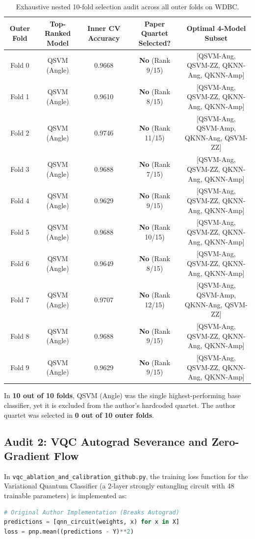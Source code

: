 \begin{table}[H]
\centering
\small
\caption{Exhaustive nested 10-fold selection audit across all outer folds on WDBC.}
\label{tab:nested-audit-table}
\begin{tabularx}{\textwidth}{ccccc}
\toprule
\textbf{Outer Fold} & \textbf{Top-Ranked Model} & \textbf{Inner CV Accuracy} & \textbf{Paper Quartet Selected?} & \textbf{Optimal 4-Model Subset} \\
\midrule
Fold 0 & QSVM (Angle) & 0.9668 & \textbf{No} (Rank 9/15) & [QSVM-Ang, QSVM-ZZ, QKNN-Ang, QKNN-Amp] \\
Fold 1 & QSVM (Angle) & 0.9610 & \textbf{No} (Rank 8/15) & [QSVM-Ang, QSVM-ZZ, QKNN-Ang, QKNN-Amp] \\
Fold 2 & QSVM (Angle) & 0.9746 & \textbf{No} (Rank 11/15) & [QSVM-Ang, QSVM-Amp, QKNN-Ang, QSVM-ZZ] \\
Fold 3 & QSVM (Angle) & 0.9688 & \textbf{No} (Rank 7/15) & [QSVM-Ang, QSVM-ZZ, QKNN-Ang, QKNN-Amp] \\
Fold 4 & QSVM (Angle) & 0.9629 & \textbf{No} (Rank 9/15) & [QSVM-Ang, QSVM-ZZ, QKNN-Ang, QKNN-Amp] \\
Fold 5 & QSVM (Angle) & 0.9688 & \textbf{No} (Rank 10/15) & [QSVM-Ang, QSVM-ZZ, QKNN-Ang, QKNN-Amp] \\
Fold 6 & QSVM (Angle) & 0.9649 & \textbf{No} (Rank 8/15) & [QSVM-Ang, QSVM-ZZ, QKNN-Ang, QKNN-Amp] \\
Fold 7 & QSVM (Angle) & 0.9707 & \textbf{No} (Rank 12/15) & [QSVM-Ang, QSVM-Amp, QKNN-Ang, QSVM-ZZ] \\
Fold 8 & QSVM (Angle) & 0.9688 & \textbf{No} (Rank 9/15) & [QSVM-Ang, QSVM-ZZ, QKNN-Ang, QKNN-Amp] \\
Fold 9 & QSVM (Angle) & 0.9629 & \textbf{No} (Rank 9/15) & [QSVM-Ang, QSVM-ZZ, QKNN-Ang, QKNN-Amp] \\
\bottomrule
\end{tabularx}
\end{table}

In \textbf{10 out of 10 folds}, QSVM (Angle) was the single highest-performing base classifier, yet it is excluded from the author's hardcoded quartet. The author quartet was selected in \textbf{0 out of 10 outer folds}.

\subsection{Audit 2: VQC Autograd Severance and Zero-Gradient Flow}
In \texttt{vqc\_ablation\_and\_calibration\_github.py}, the training loss function for the Variational Quantum Classifier (a 2-layer strongly entangling circuit with 48 trainable parameters) is implemented as:
\begin{lstlisting}[language=Python]
# Original Author Implementation (Breaks Autograd)
predictions = [qnn_circuit(weights, x) for x in X]
loss = pnp.mean((predictions - Y)**2)
\end{lstlisting}


